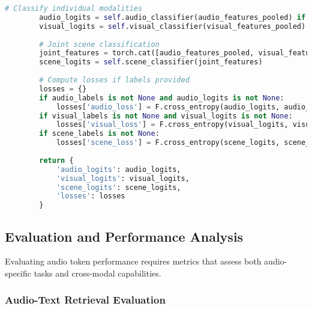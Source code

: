 \begin{lstlisting}[language=Python, caption=Audio-visual scene analysis]
        # Classify individual modalities
        audio_logits = self.audio_classifier(audio_features_pooled) if audio_features_pooled is not None else None
        visual_logits = self.visual_classifier(visual_features_pooled) if visual_features_pooled is not None else None
        
        # Joint scene classification
        joint_features = torch.cat([audio_features_pooled, visual_features_pooled], dim=-1)
        scene_logits = self.scene_classifier(joint_features)
        
        # Compute losses if labels provided
        losses = {}
        if audio_labels is not None and audio_logits is not None:
            losses['audio_loss'] = F.cross_entropy(audio_logits, audio_labels)
        if visual_labels is not None and visual_logits is not None:
            losses['visual_loss'] = F.cross_entropy(visual_logits, visual_labels)
        if scene_labels is not None:
            losses['scene_loss'] = F.cross_entropy(scene_logits, scene_labels)
        
        return {
            'audio_logits': audio_logits,
            'visual_logits': visual_logits,
            'scene_logits': scene_logits,
            'losses': losses
        }
\end{lstlisting}

\subsection{Evaluation and Performance Analysis}

Evaluating audio token performance requires metrics that assess both audio-specific tasks and cross-modal capabilities.

\subsubsection{Audio-Text Retrieval Evaluation}

